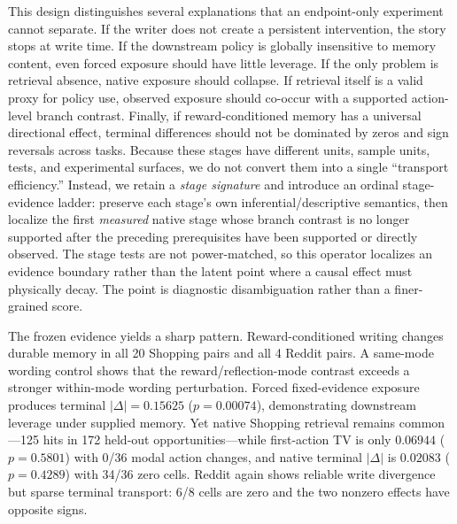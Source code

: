 This design distinguishes several explanations that an endpoint-only experiment cannot separate. If the writer does not create a persistent intervention, the story stops at write time. If the downstream policy is globally insensitive to memory content, even forced exposure should have little leverage. If the only problem is retrieval absence, native exposure should collapse. If retrieval itself is a valid proxy for policy use, observed exposure should co-occur with a supported action-level branch contrast. Finally, if reward-conditioned memory has a universal directional effect, terminal differences should not be dominated by zeros and sign reversals across tasks. Because these stages have different units, sample units, tests, and experimental surfaces, we do not convert them into a single ``transport efficiency.'' Instead, we retain a \emph{stage signature} and introduce an ordinal stage-evidence ladder: preserve each stage's own inferential/descriptive semantics, then localize the first \emph{measured} native stage whose branch contrast is no longer supported after the preceding prerequisites have been supported or directly observed. The stage tests are not power-matched, so this operator localizes an evidence boundary rather than the latent point where a causal effect must physically decay. The point is diagnostic disambiguation rather than a finer-grained score.

The frozen evidence yields a sharp pattern. Reward-conditioned writing changes durable memory in all 20 Shopping pairs and all 4 Reddit pairs. A same-mode wording control shows that the reward/reflection-mode contrast exceeds a stronger within-mode wording perturbation. Forced fixed-evidence exposure produces terminal $|\Delta|=0.15625$ ($p=0.00074$), demonstrating downstream leverage under supplied memory. Yet native Shopping retrieval remains common---125 hits in 172 held-out opportunities---while first-action TV is only $0.06944$ ($p=0.5801$) with 0/36 modal action changes, and native terminal $|\Delta|$ is $0.02083$ ($p=0.4289$) with 34/36 zero cells. Reddit again shows reliable write divergence but sparse terminal transport: 6/8 cells are zero and the two nonzero effects have opposite signs.


